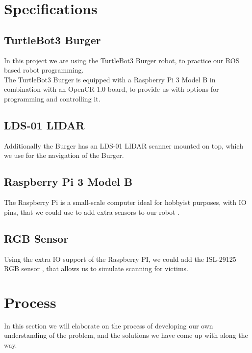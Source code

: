 \documentclass[conference]{IEEEtran}
\begin{document}
\section{Specifications}\label{specs}
\subsection{TurtleBot3 Burger}
In this project we are using the TurtleBot3 Burger robot, to practice our ROS based robot programming.\\
The TurtleBot3 Burger is equipped with a Raspberry Pi 3 Model B \cite{b1} in combination with an OpenCR 1.0 board, to 
provide us with options for programming and controlling it. \\

\subsection{LDS-01 LIDAR}
Additionally the Burger has an LDS-01\cite{b2} LIDAR scanner mounted on top, which we use for the navigation of the Burger.\\

\subsection{Raspberry Pi 3 Model B}
The Raspberry Pi is a small-scale computer ideal for hobbyist purposes, with IO pins, that we could use to add extra sensors to
our robot \cite{b3}.\\

\subsection{RGB Sensor}
Using the extra IO support of the Raspberry PI, we could add the ISL-29125 RGB sensor \cite{b4}, that allows us to simulate scanning for
victims.\\

\section{Process}\label{process}
In this section we will elaborate on the process of developing our own understanding of the problem, and the solutions we have 
come up with along the way.\\
\end{document}
